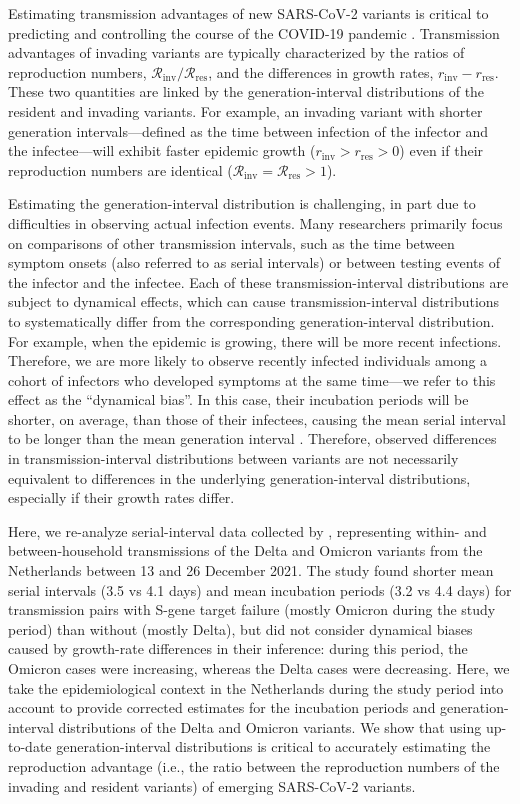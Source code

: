 \documentclass[12pt]{article}
\newcommand{\Rx}[1]{\ensuremath{{\mathcal R}_{#1}}\xspace}
\newcommand{\Rres}{\Rx{\mathrm{res}}}
\newcommand{\Rinv}{\Rx{\mathrm{inv}}}
\newcommand{\rx}[1]{\ensuremath{{r}_{#1}}\xspace}
\newcommand{\rres}{\rx{\mathrm{res}}}
\newcommand{\rinv}{\rx{\mathrm{inv}}}
\begin{document}
Estimating transmission advantages of new SARS-CoV-2 variants is critical to predicting and controlling the course of the COVID-19 pandemic \citep{park2021roles}.
Transmission advantages of invading variants are typically characterized by the ratios of reproduction numbers, $\Rinv/\Rres$, and the differences in growth rates, $\rinv-\rres$.
These two quantities are linked by the generation-interval distributions of the resident and invading variants.
For example, an invading variant with shorter generation intervals---defined as the time between infection of the infector and the infectee---will exhibit faster epidemic growth ($\rinv > \rres > 0$) even if their reproduction numbers are identical ($\Rinv = \Rres > 1$).

Estimating the generation-interval distribution is challenging, in part due to difficulties in observing actual infection events.
Many researchers primarily focus on comparisons of other transmission intervals, such as the time between symptom onsets (also referred to as serial intervals) or between testing events \citep{abbott2022test} of the infector and the infectee.
Each of these transmission-interval distributions are subject to dynamical effects, which can cause transmission-interval distributions to systematically differ from the corresponding generation-interval distribution.
For example, when the epidemic is growing, there will be more recent infections. 
Therefore, we are more likely to observe recently infected individuals among a cohort of infectors who developed symptoms at the same time---we refer to this effect as the ``dynamical bias''.
In this case, their incubation periods will be shorter, on average, than those of their infectees, causing the mean serial interval to be longer than the mean generation interval \citep{park2021forward}.
Therefore, observed differences in transmission-interval distributions between variants are not necessarily equivalent to differences in the underlying generation-interval distributions, especially if their growth rates differ.

Here, we re-analyze serial-interval data collected by \citep{backer2021omicron}, representing within- and between-household transmissions of the Delta and Omicron variants from the Netherlands between 13 and 26 December 2021.
The study found shorter mean serial intervals (3.5 vs 4.1 days) and mean incubation periods (3.2 vs 4.4 days) for transmission pairs with S-gene target failure (mostly Omicron during the study period) than without (mostly Delta), but did not consider dynamical biases caused by growth-rate differences in their inference:
during this period, the Omicron cases were increasing, whereas the Delta cases were decreasing.
Here, we take the epidemiological context in the Netherlands during the study period into account to provide corrected estimates for the incubation periods and generation-interval distributions of the Delta and Omicron variants.
We show that using up-to-date generation-interval distributions is critical to accurately estimating the reproduction advantage (i.e., the ratio between the reproduction numbers of the invading and resident variants) of emerging SARS-CoV-2 variants.
\end{document}
